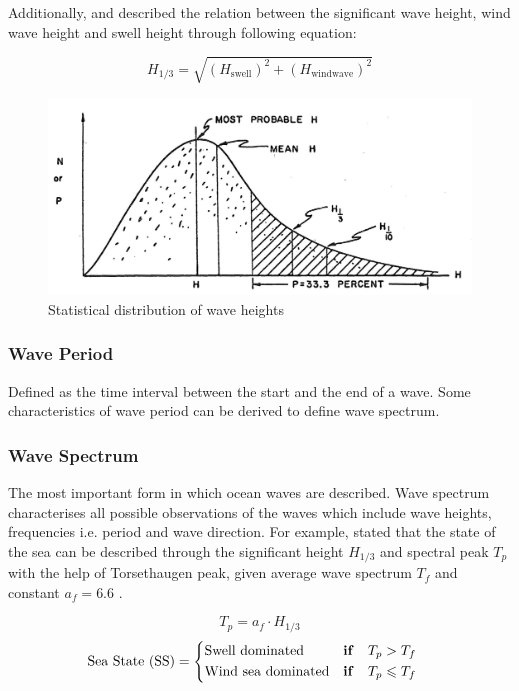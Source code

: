 Additionally,  and  described the relation between the significant wave height, wind wave height and swell height through following equation:

\begin{equation}\label{eqn:H_sig_root}
    H_{1/3} = \sqrt{(H_{\text{swell}})^2 + (H_{\text{windwave}})^2} 
\end{equation}

\begin{figure}[h]
    \centering
        \includegraphics[width=.75\textwidth]{02_figures/Bretschneider_1965_wavedist.jpg}
        \caption{Statistical distribution of wave heights }
        \label{fig:wavestats}
\end{figure}

\subsubsection*{Wave Period}

Defined as the time interval between the start and the end of a wave. Some characteristics of wave period can be derived to define wave spectrum.

\subsubsection*{Wave Spectrum}

The most important form in which ocean waves are described. Wave spectrum characterises all possible observations of the waves which include wave heights, frequencies i.e. period and wave direction. For example,  stated that the state of the sea can be described through the significant height $H_{1/3}$ and spectral peak $T_p$ with the help of Torsethaugen peak, given average wave spectrum $T_f$ and constant $a_f = 6.6$  . 

\begin{equation}\label{eqn:T_p_spectralpeak}
    T_p = a_f\cdot H_{1/3}
\end{equation}
\begin{equation}
    \label{eqn:H_s_and_Tp}
    \text{Sea State (SS)} = 
    \begin{cases}
        \begin{aligned}
            &\text{Swell dominated}  &&\text{\textbf{if}} \quad T_p > T_f \\ 
            &\text{Wind sea dominated} && \text{\textbf{if}} \quad T_p \leqslant T_f 
        \end{aligned}     
    \end{cases} 
\end{equation}

